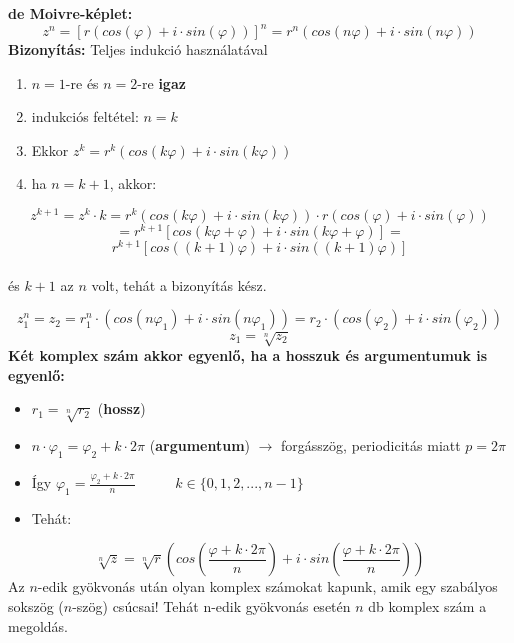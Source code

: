 \documentclass[11pt,a4paper]{article}
\begin{document}
\begin{tcolorbox}[colback=green!5!white,colframe=green!60!black,title= 5. Komplex számok hatványozása]
    \textbf{de Moivre-képlet:} 
    $$z^n = [r(cos(\varphi)+i\cdot sin(\varphi))]^n=r^n(cos(n\varphi)+i\cdot sin(n\varphi))$$
    \textbf{Bizonyítás:} Teljes indukció használatával
    \begin{enumerate}
        \item \(n=1\)-re és \(n=2\)-re \textbf{igaz}
        \item indukciós feltétel: \(n = k\)
        \item Ekkor \(z^k= r^k(cos(k\varphi)+i\cdot sin(k\varphi))\)
        \item ha \(n = k + 1\), akkor:
    \end{enumerate}
    $$z^{k+1}=z^k\cdot k = r^k(cos(k\varphi)+i\cdot sin(k\varphi))\cdot r(cos(\varphi) +i\cdot sin(\varphi))$$
    $$=r^{k+1}[cos(k\varphi + \varphi)+ i\cdot sin(k\varphi + \varphi)] =$$
    $$r^{k+1}[cos((k+1)\varphi)+ i\cdot sin((k+1)\varphi)] $$\\
    és \(k+1\) az \(n\) volt, tehát a bizonyítás kész.

\end{tcolorbox}

\begin{tcolorbox}[colback=green!5!white,colframe=green!60!black,title= 6. Komplex számok gyökvonása]
$$z_1^n = z_2=r_1^n\cdot (cos(n\varphi_1)+i\cdot sin(n\varphi_1)) = r_2\cdot (cos(\varphi_2)+i\cdot sin(\varphi_2))$$  
$$z_1 = \sqrt[n]{z_2} $$  
\textbf{Két komplex szám akkor egyenlő, ha a hosszuk és argumentumuk is egyenlő:}
    \begin{itemize}
        \item \(r_1= \sqrt[n]{r_2}\) \hspace{61pt} (\textbf{hossz})
        \item \(n\cdot \varphi_1 = \varphi_2 + k\cdot 2\pi\) \hspace{10pt} (\textbf{argumentum}) \(\rightarrow\) forgásszög, periodicitás miatt \(p = 2\pi \)
        \item Így \(\varphi_1 = \frac{\varphi_2+k\cdot2\pi}{n} \hspace{30pt}\) \(k \in \{0, 1, 2, ... , n - 1\}\)
        \item Tehát: 
    \end{itemize}
    $$\sqrt[n]{z}= \sqrt[n]{r}(cos(\frac{\varphi+k\cdot2\pi}{n}) + i\cdot sin(\frac{\varphi+k\cdot2\pi}{n}))$$
    Az \(n\)-edik gyökvonás után olyan komplex számokat kapunk, amik egy szabályos sokszög
    (\(n\)-szög) csúcsai! Tehát n-edik gyökvonás esetén \(n\) db komplex szám a megoldás.
\end{tcolorbox}
\newpage
\end{document}
